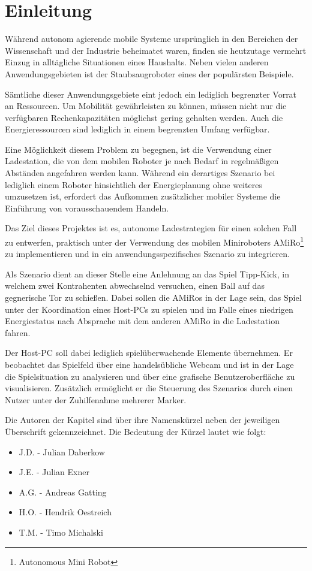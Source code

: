 \chapter[Einleitung]{Einleitung \hfill{}} \label{kap:einleitung} %

Während autonom agierende mobile Systeme ursprünglich in den Bereichen der Wissenschaft und der Industrie beheimatet waren, finden sie heutzutage vermehrt Einzug in alltägliche Situationen eines Haushalts. Neben vielen anderen Anwendungsgebieten ist der Staubsaugroboter eines der populärsten Beispiele.

Sämtliche dieser Anwendungsgebiete eint jedoch ein lediglich begrenzter Vorrat an Ressourcen. Um Mobilität gewährleisten zu können, müssen nicht nur die verfügbaren Rechenkapazitäten möglichst gering gehalten werden. Auch die Energieressourcen sind lediglich in einem begrenzten Umfang verfügbar.

Eine Möglichkeit diesem Problem zu begegnen, ist die Verwendung einer Ladestation, die von dem mobilen Roboter je nach Bedarf in regelmäßigen Abständen angefahren werden kann. Während ein derartiges Szenario bei lediglich einem Roboter hinsichtlich der Energieplanung ohne weiteres umzusetzen ist, erfordert das Aufkommen zusätzlicher mobiler Systeme die Einführung von vorausschauendem Handeln.

Das Ziel dieses Projektes ist es, autonome Ladestrategien für einen solchen Fall zu entwerfen, praktisch unter der Verwendung des mobilen Miniroboters AMiRo\footnote{Autonomous Mini Robot} zu implementieren und in ein anwendungsspezifisches Szenario zu integrieren.

Als Szenario dient an dieser Stelle eine Anlehnung an das Spiel Tipp-Kick, in welchem zwei Kontrahenten abwechselnd versuchen, einen Ball auf das gegnerische Tor zu schießen. Dabei sollen die AMiRos in der Lage sein, das Spiel unter der Koordination eines Host-PCs zu spielen und im Falle eines niedrigen Energiestatus nach Absprache mit dem anderen AMiRo in die Ladestation fahren.

Der Host-PC soll dabei lediglich spielüberwachende Elemente übernehmen. Er beobachtet das Spielfeld über eine handelsübliche Webcam und ist in der Lage die Spielsituation zu analysieren und über eine grafische Benutzeroberfläche zu visualisieren. Zusätzlich ermöglicht er die Steuerung des Szenarios durch einen Nutzer unter der Zuhilfenahme mehrerer Marker.

Die Autoren der Kapitel sind über ihre Namenskürzel neben der jeweiligen Überschrift gekennzeichnet. Die Bedeutung der Kürzel lautet wie folgt:

\begin{itemize}
	\item{J.D. - Julian Daberkow}
	\item{J.E. - Julian Exner}
	\item{A.G. - Andreas Gatting}
	\item{H.O. - Hendrik Oestreich}
	\item{T.M. - Timo Michalski}
\end{itemize}